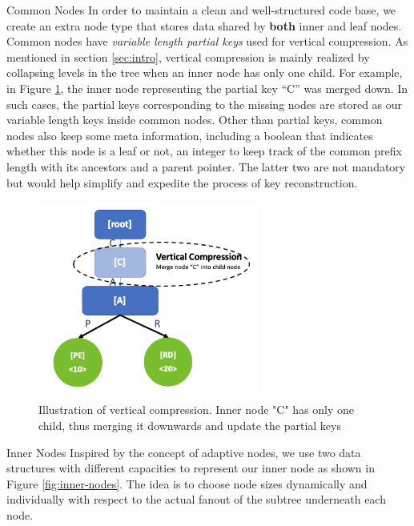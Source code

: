 \documentclass[sigplan,screen,nonacm]{acmart}
\makeatletter
\def\subsubsection{\@startsection{subsubsection}{3}%
  \z@{.5\linespacing\@plus.7\linespacing}{.1\linespacing}%
  {\normalfont\itshape}}
\makeatother
\begin{document}
\subsubsection{Common Nodes}
In order to maintain a clean and well-structured code base, we create an extra node type that stores data shared by \textbf{both} inner and leaf nodes. Common nodes have {\itshape variable length partial keys} used for vertical compression. As mentioned in section \ref{sec:intro}, vertical compression is mainly realized by collapsing levels in the tree when an inner node has only one child. For example, in Figure \ref{fig:vertical-compression}, the inner node representing the partial key “C” was merged down. In such cases, the partial keys corresponding to the missing nodes are stored as our variable length keys inside common nodes. Other than partial keys, common nodes also keep some meta information, including a boolean that indicates whether this node is a leaf or not, an integer to keep track of the common prefix length with its ancestors and a parent pointer. The latter two are not mandatory but would help simplify and expedite the process of key reconstruction. 
\begin{figure}[t]
  \centering
  \includegraphics[width=\linewidth, height=6.5cm]{pic/vertical compression.png}
  \setlength{\belowcaptionskip}{-10pt} 
  \caption{Illustration of vertical compression. Inner node "C" has only one child, thus merging it downwards and update the partial keys}
  \label{fig:vertical-compression}
\end{figure}

\subsubsection{Inner Nodes}
\label{sec:inner-nodes}
Inspired by the concept of adaptive nodes, we use two data structures with different capacities to represent our inner node as shown in Figure \ref{fig:inner-nodes}. The idea is to choose node sizes dynamically and individually with respect to the actual fanout of the subtree underneath each node. 
\end{document}
